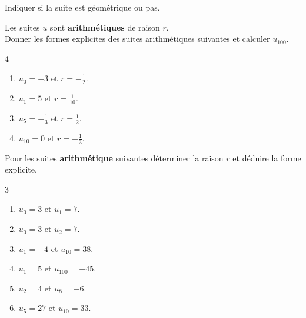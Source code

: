 \documentclass[main.tex]{subfiles}
\begin{document}
\begin{exercise}\label{chapter05:exercise:suites11} Indiquer si la suite est géométrique ou pas.\hfill 
	
\noindent{} 


\end{exercise} 
\begin{exercise}\label{chapter05:exercise:suites12}   Les suites $u$ sont \textbf{arithmétiques} de raison $r$. \\
 Donner les formes explicites des suites arithmétiques suivantes et calculer $u_{100}$.
 \vspace{-0.5em}
\begin{multicols}{4}
\begin{enumerate}[label=\arabic*),leftmargin=*]
	\item $u_0=-3$ et $r=-\tfrac{1}{2}$.
	\item $u_1=5$ et $r=\tfrac{1}{10}$.
	\item $u_5=-\tfrac{1}{3}$ et $r=\tfrac{1}{2}$.
	\item $u_{10}=0$ et $r=-\tfrac{1}{3}$. 
\end{enumerate}
\end{multicols}
\end{exercise}
\vspace{-0.5em} 
\begin{exercise} \label{chapter05:exercise:suites13}
Pour les suites \textbf{arithmétique} suivantes déterminer la raison $r$ et déduire la forme explicite.
\vspace{-0.5em}
\begin{multicols}{3}
	\begin{enumerate}[label=\arabic*),leftmargin=*]
		\item $u_0=3$ et $u_{1}=7$.   
		\item $u_0=3$ et $u_{2}=7$. 
		\item $u_1=-4$ et $u_{10}=38$.  
		\item $u_1=5$ et $u_{100}=-45$. 
		\item $u_2=4$ et $u_8=-6$. 
		\item $u_5=27$ et $u_{10}=33$. 
	\end{enumerate}
\end{multicols}
\end{exercise}
\end{document}
